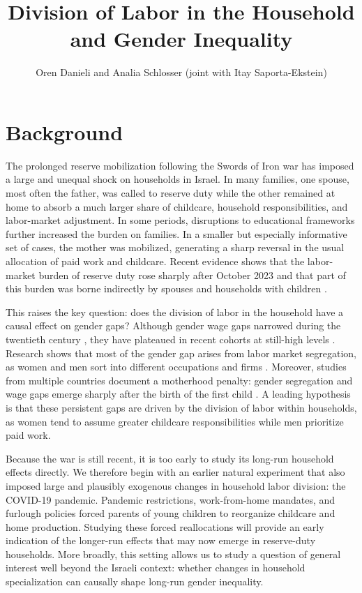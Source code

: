 \documentclass[12pt]{article}
\title{Division of Labor in the Household\\ and Gender Inequality}
\author{Oren Danieli and Analia Schlosser (joint with Itay Saporta-Ekstein)}
\date{}
\begin{document}
\maketitle

\section*{Background}

The prolonged reserve mobilization following the Swords of Iron war has imposed a large and unequal shock on households in Israel. In many families, one spouse, most often the father, was called to reserve duty while the other remained at home to absorb a much larger share of childcare, household responsibilities, and labor-market adjustment. In some periods, disruptions to educational frameworks further increased the burden on families. In a smaller but especially informative set of cases, the mother was mobilized, generating a sharp reversal in the usual allocation of paid work and childcare. Recent evidence shows that the labor-market burden of reserve duty rose sharply after October 2023 and that part of this burden was borne indirectly by spouses and households with children \citep{portal2024burden,portal2024compensation}.

This raises the key question: does the division of labor in the household have a causal effect on gender gaps? Although gender wage gaps narrowed during the twentieth century \citep{goldin2014grand}, they have plateaued in recent cohorts at still-high levels \citep{arellano2024one}. Research shows that most of the gender gap arises from labor market segregation, as women and men sort into different occupations \citep{blau2016gender} and firms \citep{card2016bargaining}. Moreover, studies from multiple countries document a motherhood penalty: gender segregation and wage gaps emerge sharply after the birth of the first child \citep{kleven2019children}. A leading hypothesis is that these persistent gaps are driven by the division of labor within households, as women tend to assume greater childcare responsibilities while men prioritize paid work.

Because the war is still recent, it is too early to study its long-run household effects directly. We therefore begin with an earlier natural experiment that also imposed large and plausibly exogenous changes in household labor division: the COVID-19 pandemic. Pandemic restrictions, work-from-home mandates, and furlough policies forced parents of young children to reorganize childcare and home production. Studying these forced reallocations will provide an early indication of the longer-run effects that may now emerge in reserve-duty households. More broadly, this setting allows us to study a question of general interest well beyond the Israeli context: whether changes in household specialization can causally shape long-run gender inequality.
\end{document}
